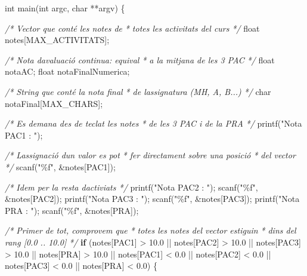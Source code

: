 \documentclass[]{book}
\newenvironment{Shaded}{\begin{snugshade}}{\end{snugshade}}
\newcommand{\CommentTok}[1]{\textcolor[rgb]{0.56,0.35,0.01}{\textit{#1}}}
\newcommand{\ControlFlowTok}[1]{\textcolor[rgb]{0.13,0.29,0.53}{\textbf{#1}}}
\newcommand{\DataTypeTok}[1]{\textcolor[rgb]{0.13,0.29,0.53}{#1}}
\newcommand{\FloatTok}[1]{\textcolor[rgb]{0.00,0.00,0.81}{#1}}
\newcommand{\NormalTok}[1]{#1}
\newcommand{\StringTok}[1]{\textcolor[rgb]{0.31,0.60,0.02}{#1}}
\begin{document}
\begin{Shaded}
\begin{Highlighting}[]
\DataTypeTok{int}\NormalTok{ main(}\DataTypeTok{int}\NormalTok{ argc, }\DataTypeTok{char}\NormalTok{ **argv) \{}

    \CommentTok{/* Vector que conté les notes de }
\CommentTok{     * totes les activitats del curs }
\CommentTok{     */}
    \DataTypeTok{float}\NormalTok{ notes[MAX\_ACTIVITATS]; }

    \CommentTok{/* Nota d\textquotesingle{}avaluació continua: equival}
\CommentTok{     * a la mitjana de les 3 PAC }
\CommentTok{     */}
    \DataTypeTok{float}\NormalTok{ notaAC;}
    \DataTypeTok{float}\NormalTok{ notaFinalNumerica;}

    \CommentTok{/* String que conté la nota final }
\CommentTok{     * de l\textquotesingle{}assignatura (MH, A, B...) }
\CommentTok{     */}
    \DataTypeTok{char}\NormalTok{ notaFinal[MAX\_CHARS];}

    \CommentTok{/* Es demana des de teclat les notes}
\CommentTok{     * de les 3 PAC i de la PRA }
\CommentTok{     */}
\NormalTok{    printf(}\StringTok{"Nota PAC1 : "}\NormalTok{);}

    \CommentTok{/* L\textquotesingle{}assignació d\textquotesingle{}un valor es pot}
\CommentTok{     * fer directament sobre una posició}
\CommentTok{     * del vector}
\CommentTok{     */}
\NormalTok{    scanf(}\StringTok{"\%f"}\NormalTok{, \&notes[PAC1]);}

    \CommentTok{/* Idem per la resta d\textquotesingle{}activiats */}
\NormalTok{    printf(}\StringTok{"Nota PAC2 : "}\NormalTok{);}
\NormalTok{    scanf(}\StringTok{"\%f"}\NormalTok{, \&notes[PAC2]);}
\NormalTok{    printf(}\StringTok{"Nota PAC3 : "}\NormalTok{);}
\NormalTok{    scanf(}\StringTok{"\%f"}\NormalTok{, \&notes[PAC3]);}
\NormalTok{    printf(}\StringTok{"Nota PRA : "}\NormalTok{);}
\NormalTok{    scanf(}\StringTok{"\%f"}\NormalTok{, \&notes[PRA]);}

    \CommentTok{/* Primer de tot, comprovem que}
\CommentTok{     * totes les notes del vector estiguin}
\CommentTok{     * dins del rang [0.0 .. 10.0]}
\CommentTok{     */}
    \ControlFlowTok{if}\NormalTok{ (notes[PAC1] \textgreater{} }\FloatTok{10.0}\NormalTok{ || notes[PAC2] \textgreater{} }\FloatTok{10.0}\NormalTok{ ||}
\NormalTok{        notes[PAC3] \textgreater{} }\FloatTok{10.0}\NormalTok{ || notes[PRA] \textgreater{} }\FloatTok{10.0}\NormalTok{ ||}
\NormalTok{        notes[PAC1] \textless{} }\FloatTok{0.0}\NormalTok{ || notes[PAC2] \textless{} }\FloatTok{0.0}\NormalTok{ ||}
\NormalTok{        notes[PAC3] \textless{} }\FloatTok{0.0}\NormalTok{ || notes[PRA] \textless{} }\FloatTok{0.0}\NormalTok{) \{}


\end{Highlighting}
\end{Shaded}
\end{document}
